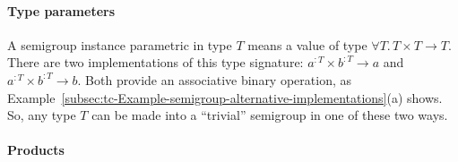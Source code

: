\paragraph{Type parameters}

A semigroup instance parametric in type $T$ means a value of type
$\forall T.\,T\times T\rightarrow T$. There are two implementations
of this type signature: $a^{:T}\times b^{:T}\rightarrow a$ and $a^{:T}\times b^{:T}\rightarrow b$.
Both provide an associative binary operation, as Example~\ref{subsec:tc-Example-semigroup-alternative-implementations}(a)
shows. So, any type $T$ can be made into a \textsf{``}trivial\textsf{''} semigroup
in one of these two ways.

\paragraph{Products}

